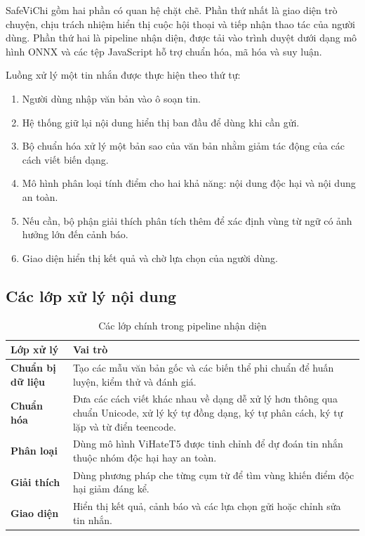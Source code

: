 \documentclass[12pt,a4paper]{article}
\begin{document}
SafeViChi gồm hai phần có quan hệ chặt chẽ. Phần thứ nhất là giao diện trò chuyện, chịu trách nhiệm hiển thị cuộc hội thoại và tiếp nhận thao tác của người dùng. Phần thứ hai là pipeline nhận diện, được tải vào trình duyệt dưới dạng mô hình ONNX và các tệp JavaScript hỗ trợ chuẩn hóa, mã hóa và suy luận.

Luồng xử lý một tin nhắn được thực hiện theo thứ tự:
\begin{enumerate}
    \item Người dùng nhập văn bản vào ô soạn tin.
    \item Hệ thống giữ lại nội dung hiển thị ban đầu để dùng khi cần gửi.
    \item Bộ chuẩn hóa xử lý một bản sao của văn bản nhằm giảm tác động của các cách viết biến dạng.
    \item Mô hình phân loại tính điểm cho hai khả năng: nội dung độc hại và nội dung an toàn.
    \item Nếu cần, bộ phận giải thích phân tích thêm để xác định vùng từ ngữ có ảnh hưởng lớn đến cảnh báo.
    \item Giao diện hiển thị kết quả và chờ lựa chọn của người dùng.
\end{enumerate}

\subsection{Các lớp xử lý nội dung}

\begin{table}[H]
    \centering
    \caption{Các lớp chính trong pipeline nhận diện}
    \begin{tabularx}{0.95\textwidth}{>{\bfseries}p{3.1cm} X}
        \toprule
        Lớp xử lý & Vai trò \\
        \midrule
        Chuẩn bị dữ liệu & Tạo các mẫu văn bản gốc và các biến thể phi chuẩn để huấn luyện, kiểm thử và đánh giá. \\
        Chuẩn hóa & Đưa các cách viết khác nhau về dạng dễ xử lý hơn thông qua chuẩn Unicode, xử lý ký tự đồng dạng, ký tự phân cách, ký tự lặp và từ điển teencode. \\
        Phân loại & Dùng mô hình ViHateT5 được tinh chỉnh để dự đoán tin nhắn thuộc nhóm độc hại hay an toàn. \\
        Giải thích & Dùng phương pháp che từng cụm từ để tìm vùng khiến điểm độc hại giảm đáng kể. \\
        Giao diện & Hiển thị kết quả, cảnh báo và các lựa chọn gửi hoặc chỉnh sửa tin nhắn. \\
        \bottomrule
    \end{tabularx}
\end{table}
\end{document}
